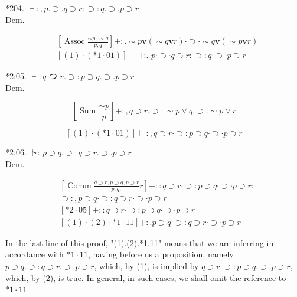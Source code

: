 \documentclass[10pt]{article}
\begin{document}
*204. $\vdash:, p . \supset . q \supset r: \supset: q . \supset . p \supset r$\\
Dem.


\begin{align*}
& {\left[\operatorname{Assoc} \frac{\sim p, \sim q}{p, q}\right]+: . \sim p \mathbf{v}(\sim q \mathbf{v} r) \cdot \supset \cdot \sim q \mathbf{v}(\sim p \mathbf{v} r)}  \tag{1}\\
& {[(1) \cdot(* 1 \cdot 01)] \quad \text { ।:. } p \cdot \supset \cdot q \supset r: \supset: q \cdot \supset \cdot p \supset r}
\end{align*}


*2:05. $\vdash: q$ つ $r . \supset: p \supset q . \supset . p \supset r$\\
Dem.


\begin{equation*}
\left[\operatorname{Sum} \frac{\sim p}{p}\right]+:, q \supset r . \supset: \sim p \vee q . \supset . \sim p \vee r \tag{1}
\end{equation*}


$$
[(1) \cdot(* 1 \cdot 01)] \vdash:, q \supset r \cdot \supset: p \supset q \cdot \supset \cdot p \supset r
$$

*2.06. ト: $p \supset q . \supset: q \supset r . \supset . p \supset r$\\
Dem.


\begin{align*}
& {\left[\operatorname{Comm} \frac{q \supset r, p \supset q, p \supset r}{p, q,} r\right]+:: q \supset r \cdot \supset: p \supset q \cdot \supset \cdot p \supset r: } \\
& \supset:, p \supset q \cdot \supset: q \supset r \cdot \supset \cdot p \supset r  \tag{1}\\
& {[* 2 \cdot 05] }+:: q \supset r \cdot \supset: p \supset q \cdot \supset \cdot p \supset r \\
& {[(1) \cdot(2) \cdot * 1 \cdot 11] }+: . p \supset q \cdot \supset: q \supset r \cdot \supset \cdot p \supset r \tag{2}
\end{align*}


In the last line of this proof, "(1).(2).*1.11" means that we are inferring in accordance with $* 1 \cdot 11$, having before us a proposition, namely $p \supset q . \supset: q \supset r . \supset . p \supset r$, which, by (1), is implied by $q \supset r . \supset: p \supset q . \supset . p \supset r$, which, by (2), is true. In general, in such cases, we shall omit the reference to $* 1 \cdot 11$.
\end{document}

